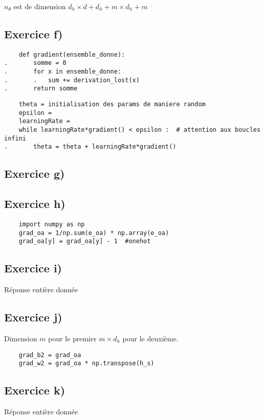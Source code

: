 \documentclass[a4paper,10pt]{article}
\begin{document}
$n_{\theta}$ est de dimension $d_{h} \times d + d_{h} + m \times d_{h} + m$

\subsection{Exercice f)} 

\begin{verbatim}
	def gradient(ensemble_donne):
.		somme = 0
.		for x in ensemble_donne:
.		.	sum += derivation_lost(x)
.		return somme
\end{verbatim}

\begin{verbatim}
	theta = initialisation des params de maniere random
	epsilon =
	learningRate =
	while learningRate*gradient() < epsilon :  # attention aux boucles infini
.		theta = theta + learningRate*gradient()
\end{verbatim}
\subsection{Exercice g)}

\subsection{Exercice h)}

\begin{verbatim}
	import numpy as np
	grad_oa = 1/np.sum(e_oa) * np.array(e_oa)
	grad_oa[y] = grad_oa[y] - 1  #onehot
\end{verbatim}

\subsection{Exercice i)}
Réponse entière donnée

\subsection{Exercice j)} 

Dimension $m$ pour le premier $ m \times d_{h}$ pour le deuxième.

\begin{verbatim}
	grad_b2 = grad_oa
	grad_w2 = grad_oa * np.transpose(h_s)
\end{verbatim}

\subsection{Exercice k)}
Réponse entière donnée
\end{document}
